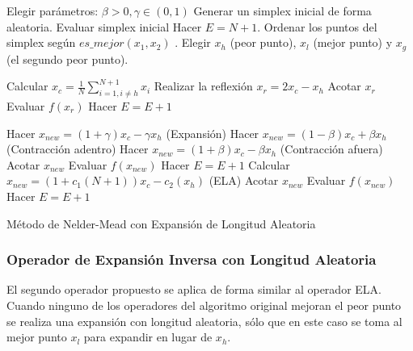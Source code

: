 \begin{algorithm}\label{alg:NMELA}
	\begin{algorithmic}
		\STATE Elegir parámetros: $\beta>0, \gamma \in (0,1)$
		\STATE Generar un simplex inicial de forma aleatoria.
        \STATE Evaluar simplex inicial
        \STATE Hacer $E=N+1$.
		\label{lin:lineaRara}
		\STATE Ordenar los puntos del simplex según $es\_mejor(x_1,x_2)$ .
		\STATE Elegir $x_h$ (peor punto), $x_l$ (mejor punto) y $x_g$ (el segundo peor punto).
		
		\STATE Calcular $x_c=\frac{1}{N} \sum_{i=1, i\neq h }^{N+1} x_i$
		\STATE Realizar la reflexión $x_r=2x_c -x_h$
        \STATE Acotar  $x_r$
        \STATE Evaluar  $f(x_r)$
        \STATE Hacer  $E=E+1$

		\STATE Hacer $x_{new}=(1+\gamma)x_c-\gamma x_h$ (Expansión)
		\ELSE {}
		\STATE Hacer $x_{new}=(1-\beta)x_c+\beta x_h$ (Contracción adentro)
		\ENDIF
		\ELSE {}
		\STATE Hacer $x_{new}=(1+\beta)x_c-\beta x_h$ (Contracción afuera)
		\ENDIF
		\ENDIF
        \STATE Acotar  $x_{new}$
        \STATE Evaluar  $f(x_{new})$
        \STATE Hacer $E=E+1$
		\STATE Calcular  $x_{new}=(1+c_1(N+1))x_c-c_2 (x_h)$ (ELA)
        \STATE Acotar  $x_{new}$
        \STATE Evaluar  $f(x_{new})$
        \STATE Hacer $E=E+1$

		\ENDIF
		\ENDWHILE
	\end{algorithmic}
	\caption{Método de Nelder-Mead con Expansión de Longitud Aleatoria}\label{alg:NMELA}
\end{algorithm}

\subsubsection{Operador de Expansión Inversa con Longitud Aleatoria }\label{NMEILA}
El segundo operador propuesto se aplica de forma similar al operador ELA. Cuando ninguno de los operadores del algoritmo original mejoran el peor punto se realiza una expansión con longitud aleatoria, sólo que en este caso se toma al mejor punto $x_l$ para expandir en lugar de $x_h$.

